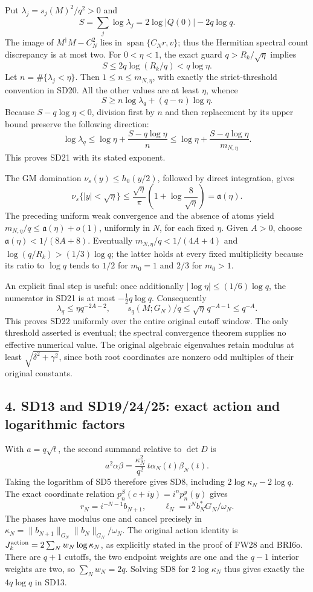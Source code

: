 \documentclass{article}
\begin{document}
Put \(\lambda_j=s_j(M)^2/q^2>0\) and \[
S=\sum_j\log\lambda_j=2\log|Q(0)|-2q\log q.
\] The image of \(M^\dagger M-C_N^2\) lies in \(\operatorname{span}\{C_Nr,v\}\); thus the Hermitian spectral count discrepancy is at most two. For \(0<\eta<1\), the exact guard \(q>R_k/\sqrt\eta\) implies \[
S\le2q\log(R_k/q)<q\log\eta.
\] Let \(n=\#\{\lambda_j<\eta\}\). Then \(1\le n\le m_{N,\eta}\), with exactly the strict-threshold convention in SD20. All the other values are at least \(\eta\), whence \[
S\ge n\log\lambda_q+(q-n)\log\eta.
\] Because \(S-q\log\eta<0\), division first by \(n\) and then replacement by its upper bound preserve the following direction: \[
\log\lambda_q\le\log\eta+\frac{S-q\log\eta}{n}
\le\log\eta+\frac{S-q\log\eta}{m_{N,\eta}}.
\] This proves SD21 with its stated exponent.

The GM domination \(\nu_s(y)\le h_0(y/2)\), followed by direct integration, gives \[
\nu_s\{|y|<\sqrt\eta\}
\le \frac{\sqrt\eta}{\pi}
          \left(1+\log\frac8{\sqrt\eta}\right)=\mathfrak a(\eta).
\] The preceding uniform weak convergence and the absence of atoms yield \(m_{N,\eta}/q\le\mathfrak a(\eta)+o(1)\), uniformly in \(N\), for each fixed \(\eta\). Given \(A>0\), choose \(\mathfrak a(\eta)<1/(8A+8)\). Eventually \(m_{N,\eta}/q<1/(4A+4)\) and \(\log(q/R_k)>(1/3)\log q\); the latter holds at every fixed multiplicity because its ratio to \(\log q\) tends to \(1/2\) for \(m_0=1\) and \(2/3\) for \(m_0>1\).

An explicit final step is useful: once additionally \(|\log\eta|\le(1/6)\log q\), the numerator in SD21 is at most \(-\tfrac12q\log q\). Consequently \[
\lambda_q\le\eta q^{-2A-2},\qquad
s_q(M;G_N)/q\le\sqrt\eta\,q^{-A-1}\le q^{-A}.
\] This proves SD22 uniformly over the entire original cutoff window. The only threshold asserted is eventual; the spectral convergence theorem supplies no effective numerical value. The original algebraic eigenvalues retain modulus at least \(\sqrt{\delta^2+\gamma^2}\), since both root coordinates are nonzero odd multiples of their original constants.

\subsection{4. SD13 and SD19/24/25: exact action and logarithmic factors}\label{sd13-and-sd192425-exact-action-and-logarithmic-factors}

With \(a=q\sqrt t\), the second summand relative to \(\det D\) is \[
a^2\alpha\beta
=\frac{\kappa_N^2}{q^2}\,t\alpha_N(t)\beta_N(t).
\] Taking the logarithm of SD5 therefore gives SD8, including \(2\log\kappa_N-2\log q\). The exact coordinate relation \(p_n^S(c+iy)=i^np_n^y(y)\) gives \[
r_N=i^{-N-1}b_{N+1},\qquad
\ell_N=i^N b_N^*G_N/\omega_N.
\] The phases have modulus one and cancel precisely in \(\kappa_N=\|b_{N+1}\|_{G_N}\|b_N\|_{G_N}/\omega_N\). The original action identity is \(J_k^{\rm action}=2\sum_Nw_N\log\kappa_N\), as explicitly stated in the proof of FW28 and BRI6o. There are \(q+1\) cutoffs, the two endpoint weights are one and the \(q-1\) interior weights are two, so \(\sum_Nw_N=2q\). Solving SD8 for \(2\log\kappa_N\) thus gives exactly the \(4q\log q\) in SD13.
\end{document}

